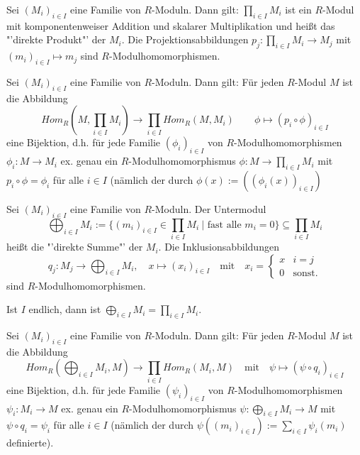 \begin{bem+df}
	Sei $(M_i)_{i \in I}$ eine Familie von $R$-Moduln. Dann gilt: $\prod_{i \in I} M_i$ ist ein $R$-Modul mit komponentenweiser Addition und skalarer Multiplikation und heißt das "'direkte Produkt"' der $M_{i}$. Die Projektionsabbildungen $p_{j}: \prod_{i \in I} M_i \to M_{j} $ mit $(m_i)_{i \in I} \mapsto m_j $ sind $R$-Modulhomomorphismen.
\end{bem+df}
\begin{sa} Sei $(M_i)_{i \in I}$ eine Familie von $R$-Moduln. Dann gilt: Für jeden $R$-Modul $M$ ist die Abbildung $$ Hom_{R}(M,\prod_{i \in I} M_i) \to \prod_{i \in I} Hom_{R}(M,M_i) \qquad \phi \mapsto (p_i \circ \phi)_{i \in I}$$
	eine Bijektion, d.h. für jede Familie $(\phi_i)_{i \in I}$ von $R$-Modulhomomorphismen $\phi_i: M \to M_i $ ex. genau ein $R$-Modulhomomorphismus $\phi: M \to \prod_{i \in I} M_i$ mit $ p_i \circ \phi = \phi_i$ für alle $i \in I$ (nämlich der durch $\phi(x) := ((\phi_i(x))_{i\in I}) $
\end{sa}
\begin{df}
	Sei $(M_i)_{i \in I}$ eine Familie von $R$-Moduln. Der Untermodul $$ \bigoplus_{i \in I} M_i := \{(m_i)_{i \in I} \in \prod_{i \in I} M_i \ | \text{ fast alle }  m_i =0\} \subseteq \prod_{i \in I} M_i $$ 
	heißt die "'direkte Summe"' der $M_i$. Die Inklusionsabbildungen $$q_j: M_j \to \bigoplus_{i \in I} M_i, \quad x \mapsto (x_i)_{i \in I} \quad \text{mit} \quad x_i=\begin{cases} x & i = j \\ 0 & \text{sonst.} \end{cases}$$ sind $R$-Modulhomomorphismen.
\end{df}
\begin{anm}
	Ist $I$ endlich, dann ist $\bigoplus_{i \in I}M_i = \prod_{i \in I} M_i$.
\end{anm}
\begin{sa} Sei $(M_i)_{i \in I}$ eine Familie von $R$-Moduln. Dann gilt: Für jeden $R$-Modul $M$ ist die Abbildung $$ Hom_{R}(\bigoplus_{i \in I} M_i,M) \to \prod_{i \in I} Hom_{R}(M_i,M) \quad \text{mit} \quad \psi \mapsto (\psi \circ q_i)_{i \in I}$$
	eine Bijektion, d.h. für jede Familie $(\psi_i)_{i \in I}$ von $R$-Modulhomomorphismen $\psi_i: M_i \to M $ ex. genau ein $R$-Modulhomomorphismus $\psi: \bigoplus_{i \in I}M_i \to M$ mit $ \psi \circ q_i = \psi_i$ für alle $i \in I$ (nämlich der durch $\psi((m_i)_{i \in I}) := \sum_{i\in I} \psi_i(m_i)$ definierte).
\end{sa}
